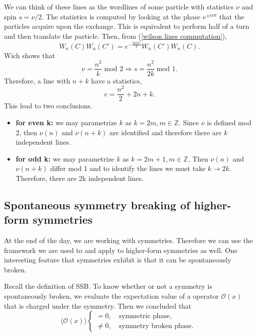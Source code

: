 \documentclass{article}
\begin{document}
We can think of these lines as the wordlines of some particle with statistics $\nu$ and spin $s=\nu/2$. The statistics is computed by looking at the phase $e^{\pm i\nu\pi}$ that the particles acquire upon the exchange. This is equivalent to perform half of a turn and then translate the particle. Then, from (\ref{wilson lines commutation}),
\begin{equation}
	W_n(C)W_n(C')=e^{-\frac{2\pi in^2}{k}}W_n(C')W_n(C).
\end{equation} 
Wich shows that 
\begin{equation}
	\nu=\frac{n^2}{k}\;\text{mod }2\Rightarrow s=\frac{n^2}{2k}\;\text{mod }1.
\end{equation}
Therefore, a line with $n+k$ have a statistics, 
\begin{equation}
	v=\frac{n^2}{2}+2n+k.
\end{equation}
This lead to two conclusions. 

\begin{itemize}
	\item \textbf{for even k:} we may parametrize $k$ as $k=2m,m\in\mathbb{Z}$. Since $\nu$ is defined mod 2, then $\nu(n)$ and $\nu(n+k)$ are identified and therefore there are $k$ independent lines. 
	\item \textbf{for odd k:} we may parametrize $k$ as $k=2m+1,m\in\mathbb{Z}$. Then $\nu(n)$ and $\nu(n+k)$ differ mod 1 and to identify the lines we must take $k\to 2k$. Therefore, there are 2k independent lines. 
\end{itemize}
\subsection{Spontaneous symmetry breaking of higher-form symmetries}
At the end of the day, we are working with symmetries. Therefore we can use the framework we are used to and apply to higher-form symmetries as well. One interesting feature that symmetries exhibit is that it can be spontaneously broken. 

Recall the definition of SSB. To know whether or not a symmetry is spontaneously broken, we evaluate the expectation value of a operator $\mathcal{O}(x)$ that is charged under the symmetry. Then we concluded that
\begin{equation}\label{ssb definition 5}
	\langle \mathcal{O}(x)\rangle
	\begin{cases}
		= 0,\quad \text{symmetric phase,}\\
		\neq 0,\quad \text{symmetry broken phase. }
	\end{cases}
\end{equation}
\end{document}
